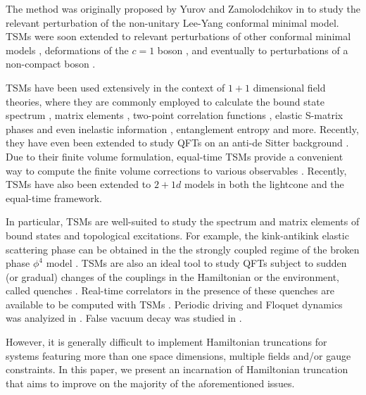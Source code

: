 \documentclass[twocolumn,secnumarabic,amssymb, nobibnotes, aps, prd]{revtex4-2}
\begin{document}
The method was originally proposed by Yurov and Zamolodchikov in \cite{yurov1990truncated} to study the relevant perturbation of the non-unitary Lee-Yang conformal minimal model. TSMs were soon extended to relevant perturbations of other conformal minimal models \cite{yurov1991truncated,Lassig:1990xy,Lassig:1990wc}, deformations of the $c=1$ boson \cite{Feverati:1998va,Feverati:1998dt}, and eventually to perturbations of a non-compact boson \cite{Coser:2014lla,Rychkov:2014eea,Rychkov:2015vap,Bajnok:2015bgw}.

TSMs have been used extensively in the context of $1+1$ dimensional field theories, where they are commonly employed to calculate the bound state spectrum \cite{Lassig:1990xy}, matrix elements \cite{Pozsgay:2007kn,Pozsgay:2007gx}, two-point correlation functions \cite{Kukuljan:2018whw}, elastic S-matrix phases \cite{Bajnok:2015bgw,sinhgordon} and even inelastic information \cite{Gabai2019}, entanglement entropy \cite{Palmai:2016act,Lencses:2018paa,Murciano:2021dga,Murciano:2021huy} and more. Recently, they have even been extended to study QFTs on an anti-de Sitter background \cite{Hogervorst:2021spa}.
Due to their finite volume formulation, equal-time TSMs provide a convenient way to compute the finite volume corrections to various observables \cite{Klassen:1990ub,Pozsgay:2007gx,Pozsgay:2007kn,Pozsgay:2014gza,Bajnok:2019cdf}.
Recently, TSMs have also been extended to $2+1d$ models in both the lightcone \cite{Anand:2020qnp,https://doi.org/10.48550/arxiv.2209.14306} and the equal-time \cite{Elias-Miro:2020qwz} framework.

In particular, TSMs are well-suited to study the spectrum and matrix elements of bound states and topological excitations. For example, the kink-antikink elastic scattering phase can be obtained in the the strongly coupled regime of the broken phase $\phi^4$ model \cite{Bajnok:2015bgw}.
TSMs are also an ideal tool to study QFTs subject to sudden (or gradual) changes of the couplings in the Hamiltonian or the environment, called quenches \cite{Rakovszky:2016ugs,Horvath:2017wzf,Hodsagi:2020dqq}. Real-time correlators in the presence of these quenches are available to be computed with TSMs \cite{Kukuljan:2018whw}. Periodic driving and Floquet dynamics was analyized in \cite{Bajnok:2021twm}. False vacuum decay was studied in \cite{Szasz-Schagrin:2022wkk}.

However, it is generally difficult to implement Hamiltonian truncations for systems featuring more than one space dimensions, multiple fields and/or gauge constraints.
In this paper, we present an incarnation of Hamiltonian truncation that aims to improve on the majority of the aforementioned issues.
\end{document}
